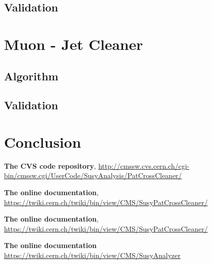 \documentclass{cmspaper}
\begin{document}
\subsection{Validation}

\section{Muon - Jet Cleaner}
\subsection{Algorithm}
\subsection{Validation}

\section{Conclusion}


\pagebreak
\begin{thebibliography}{9}
   {\bf The CVS code repository},
    \underline{http://cmssw.cvs.cern.ch/cgi-bin/cmssw.cgi/UserCode/SusyAnalysis/PatCrossCleaner/}

   {\bf The online documentation},
    \underline{https://twiki.cern.ch/twiki/bin/view/CMS/SusyPatCrossCleaner/}

   {\bf The online documentation},
    \underline{https://twiki.cern.ch/twiki/bin/view/CMS/SusyPatCrossCleaner/}

   {\bf The online documentation}
    \underline{https://twiki.cern.ch/twiki/bin/view/CMS/SusyAnalyzer}

\end{thebibliography}
 
\end{document}
